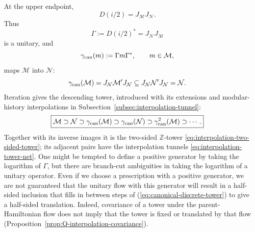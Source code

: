 \documentclass[a4paper,11pt]{article}
\theoremstyle{definition}
\newcommand{\mN}{\mathcal{N}}
\newcommand{\mM}{\mathcal{M}}
\begin{document}
At the upper endpoint,
\begin{equation}
    \boxed{
    D(i/2)=J_{\mM}J_{\mN} .
    }
    \label{eq:D-half-common}
\end{equation}
Thus
\begin{equation}
    \Gamma:=D(i/2)^*=J_{\mN}J_{\mM}
\end{equation}
is a unitary, and
\begin{equation}
    \gamma_{\rm can}(m)
    :=
    \Gamma m\Gamma^*,
    \qquad
    m\in\mM,
    \label{eq:canonical-endomorphism-common}
\end{equation}
maps $\mM$ into $\mN$:
\begin{equation}
    \gamma_{\rm can}(\mM)
    =
    J_{\mN}\mM'J_{\mN}
    \subseteq
    J_{\mN}\mN'J_{\mN}
    =
    \mN .
\end{equation}
Iteration gives the descending tower, introduced with its extensions
and modular-history interpolations in
Subsection~\ref{subsec:interpolation-tunnel}:
\begin{equation}
    \boxed{
    \mM
    \supset
    \mN
    \supset
    \gamma_{\rm can}(\mM)
    \supset
    \gamma_{\rm can}(\mN)
    \supset
    \gamma_{\rm can}^2(\mM)
    \supset\cdots .
    }
    \label{eq:canonical-discrete-tower}
\end{equation}
Together with its inverse images it is the two-sided $\mathbb Z$-tower
\eqref{eq:interpolation-two-sided-tower}; its adjacent pairs have the
interpolation tunnels \eqref{eq:interpolation-tower-net}.
One might be tempted to define a positive generator by taking the logarithm of $\Gamma$, but there are branch-cut ambiguities in taking the logarithm of a unitary operator. 
Even if we choose a prescription with a positive generator, we are not guaranteed that the unitary flow with this generator will result in a half-sided inclusion that fills in between steps of (\ref{eq:canonical-discrete-tower}) to give a half-sided translation. Indeed, covariance of a tower under the parent-Hamiltonian flow
does not imply that the tower is fixed or translated by that flow
(Proposition~\ref{prop:Q-interpolation-covariance}).
\end{document}
